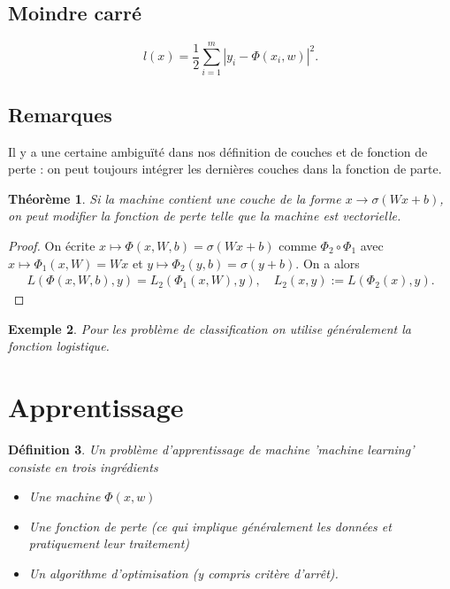 \documentclass[11pt,a4paper, french]{article}
\newcommand{\abs}[1]{\left|#1\right|}
\newtheorem{theorem}{Théorème}[section]
\newtheorem{definition}[theorem]{Définition}
\newtheorem{example}[theorem]{Exemple}
\begin{document}
\subsection{Moindre carré}\label{subsec:}
%
%
\begin{equation}\label{equation:}
l(x)= \frac12\sum_{i=1}^m \abs{y_i-\Phi(x_i,w)}^2.
\end{equation}
%
%
\subsection{Remarques}\label{subsec:}
%
Il y a une certaine ambiguïté dans nos définition de couches et de fonction de perte : on peut toujours intégrer les dernières couches dans la fonction de parte.
%
%
\begin{theorem}\label{theorem:}
Si la machine contient une couche de la forme $x\to \sigma(Wx+b)$, on peut modifier la fonction de perte telle que la machine est vectorielle.
\end{theorem}
%
%
\begin{proof}
On écrite $x\mapsto\Phi(x,W,b) = \sigma(Wx+b)$ comme $\Phi_2 \circ \Phi_1$ avec $x\mapsto \Phi_1(x,W) = Wx$ et $y\mapsto\Phi_2(y,b) = \sigma(y+b)$. On a alors
\begin{align*}
L(\Phi(x,W,b), y) = L_2(\Phi_1(x,W),y),\quad L_2 (x,y) := L(\Phi_2(x),y).
\end{align*}
\end{proof}
%
%
\begin{example}\label{example:}
Pour les problème de classification on utilise généralement la fonction logistique.
\end{example}
%
%
\section{Apprentissage}\label{sec:}
%
%
\begin{definition}\label{definition:}
Un problème d'apprentissage de machine 'machine learning' consiste en trois ingrédients
\begin{itemize}
\item Une machine $\Phi(x,w)$
\item Une fonction de perte (ce qui implique généralement les données et pratiquement leur traitement)
\item Un algorithme d'optimisation (y compris critère d'arrêt).
\end{itemize}
\end{definition}
%
%
\end{document}
